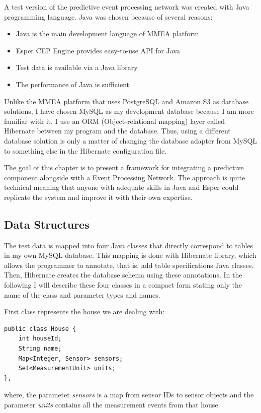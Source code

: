 
A test version of the predictive event processing network was created with Java programming language. Java was chosen because of several reasons:
\begin{itemize}
\item{Java is the main development language of MMEA platform}
\item{Esper CEP Engine provides easy-to-use API for Java}
\item{Test data is available via a Java library}
\item{The performance of Java is sufficient}
\end{itemize}

Unlike the MMEA platform that uses PostgreSQL and Amazon S3 as database solutions, I have chosen MySQL as my development database because I am more familiar with it. I use an ORM (Object-relational mapping) layer called Hibernate between my program and the database. Thus, using a different database solution is only a matter of changing the database adapter from MySQL to something else in the Hibernate configuration file.

The goal of this chapter is to present a framework for integrating a predictive component alongside with a Event Processing Network. The approach is quite technical meaning that anyone with adequate skills in Java and Esper could replicate the system and improve it with their own expertise.

\subsection{Data Structures}
The test data is mapped into four Java classes that directly correspond to tables in my own MySQL database. This mapping is done with Hibernate library, which allows the programmer to annotate, that is, add table specifications Java classes. Then, Hibernate creates the database schema using these annotations. In the following I will describe these four classes in a compact form stating only the name of the class and parameter types and names. 

First class represents the house we are dealing with:
\begin{Verbatim}[xleftmargin=1.5em]
public class House {
	int houseId;
	String name;
	Map<Integer, Sensor> sensors;
	Set<MeasurementUnit> units;
},
\end{Verbatim}
where, the parameter \emph{sensors} is a map from sensor IDs to sensor objects and the parameter \emph{units} contains all the measurement events from that house.

